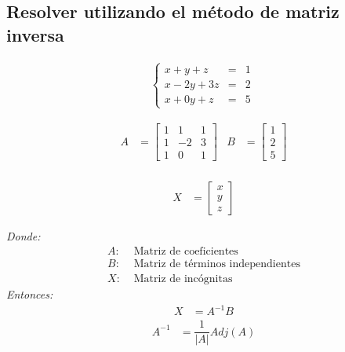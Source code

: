 \documentclass[11pt, a4paper]{article}
\begin{document}
\subsection{Resolver utilizando el método de matriz inversa}
\vspace{-0.5cm}
\begin{align*}
  \left\{
  \begin{array}{rcl}
    x+y+z &= &1\\
    x-2y+3z &= &2\\
    x+0y+z &= &5
  \end{array}
  \right.\
\end{align*}
\begin{multicols*}{2}
  \begin{align*}
    A &= \begin{bmatrix}
      1 & 1 & 1\\
      1 & -2 & 3\\
      1 & 0 & 1
    \end{bmatrix}&
    B &= \begin{bmatrix}
      1\\
      2\\
      5
    \end{bmatrix}\\
  \end{align*}
  \vspace{-2cm}
  \begin{center}
    \begin{align*}
      X &= \begin{bmatrix}
        x\\
        y\\
        z
      \end{bmatrix}
    \end{align*}
  \end{center}
  \textit{Donde:}
  \begin{align*}
    A: &\text{ Matriz de coeficientes}\\
    B: &\text{ Matriz de términos independientes}\\
    X: &\text{ Matriz de incógnitas}
  \end{align*}
  \textit{Entonces:}
  \begin{align*}
    X &= A^{-1}B
  \end{align*}
  \begin{align*}
    A^{-1} &= \dfrac{1}{|A|}Adj\left(A\right)
  \end{align*}

\end{multicols*}
\end{document}
